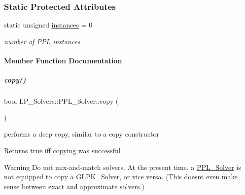 \subsubsection*{Static Protected Attributes}
\begin{DoxyCompactItemize}
\item 
\mbox{\label{group___c_l_s_solvers_a4c6a4a141e8c2eb4adbdef6ad73cec21}} 
static unsigned \hyperlink{group___c_l_s_solvers_a4c6a4a141e8c2eb4adbdef6ad73cec21}{instances} = 0
\begin{DoxyCompactList}\small\item\em number of P\+PL instances \end{DoxyCompactList}\end{DoxyCompactItemize}


\paragraph{Member Function Documentation}
\mbox{\label{group___c_l_s_solvers_aa447a576420597eb9ff86b8875f5d30c}} 
\subparagraph{\texorpdfstring{copy()}{copy()}}
{\footnotesize\ttfamily bool L\+P\+\_\+\+Solvers\+::\+P\+P\+L\+\_\+\+Solver\+::copy (\begin{DoxyParamCaption}\item[{const \hyperlink{group___c_l_s_solvers_class_l_p___solvers_1_1_l_p___solver}{L\+P\+\_\+\+Solver} $\ast$}]{ }\end{DoxyParamCaption})\hspace{0.3cm}{\ttfamily [virtual]}}



performs a deep copy, similar to a copy constructor 

\begin{DoxyReturn}{Returns}
{\ttfamily true} iff copying was successful 
\end{DoxyReturn}
\begin{DoxyWarning}{Warning}
Do not mix-\/and-\/match solvers. At the present time, a \hyperlink{group___c_l_s_solvers_class_l_p___solvers_1_1_p_p_l___solver}{P\+P\+L\+\_\+\+Solver} is not equipped to copy a \hyperlink{group___c_l_s_solvers_class_l_p___solvers_1_1_g_l_p_k___solver}{G\+L\+P\+K\+\_\+\+Solver}, or vice versa. (This doesn\textquotesingle{}t even make sense between exact and approximate solvers.) 
\end{DoxyWarning}


